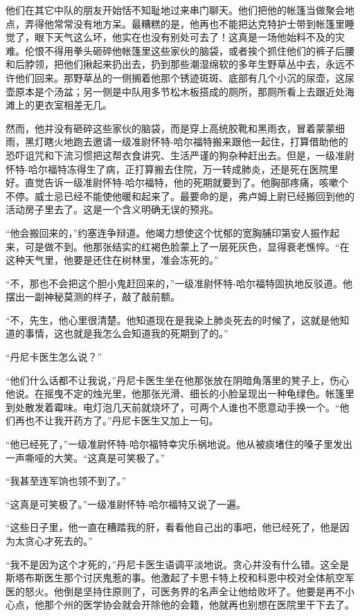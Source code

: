  


    他们在其它中队的朋友开始恬不知耻地过来串门聊天。他们把他的帐篷当做聚会地点，弄得他常常没有地方呆。最糟糕的是，他再也不能把达克特护士带到帐篷里睡觉了，眼下天气这么坏，他实在也没有别处可去了！这真是一场他始料不及的灾难。伦恨不得用拳头砸碎他帐篷里这些家伙的脑袋，或者挨个抓住他们的裤子后腰和后脖领，把他们揪起来扔出去，扔到那些潮湿绵软的多年生野草丛中去，永远不许他们回来。那野草丛的一侧搁着他那个锈迹斑斑、底部有几个小沉的尿壶，这尿壶原本是个汤盆；另一侧是中队用多节松木板搭成的厕所，那厕所看上去跟近处海滩上的更衣室相差无几。

    然而，他并没有砸碎这些家伙的脑袋，而是穿上高统胶靴和黑雨衣，冒着蒙蒙细雨，黑灯瞎火地跑去邀请一级准尉怀特-哈尔福特搬来跟他一起住，打算借助他的恐吓诅咒和下流习惯把这帮衣食讲究、生活严谨的狗杂种赶出去。但是，一级准尉怀特-哈尔福特冻得生了病，正打算搬去住院，万一转成肺炎，还是死在医院里好。直觉告诉一级准尉怀特-哈尔福特，他的死期就要到了。他胸部疼痛，咳嗽个不停。威士忌已经不能使他暖和起来了。最要命的是，弗卢姆上尉已经搬回到他的活动房子里去了。这是一个含义明确无误的预兆。

    “他会搬回来的，”约塞连争辩道。他竭力想使这个忧郁的宽胸脯印第安人振作起来，可是做不到。他那张结实的红褐色脸蒙上了一层死灰色，显得衰老憔悴。“在这种天气里，他要是还住在树林里，准会冻死的。”

    “不，那也不会把这个胆小鬼赶回来的，”一级准尉怀特-哈尔福特固执地反驳道。他摆出一副神秘莫测的样子，敲了敲前额。

 


    “不，先生，他心里很清楚。他知道现在是我染上肺炎死去的时候了，这就是他知道的事情，这也就是我怎么会知道我的死期到了的。”

    “丹尼卡医生怎么说？”

    “他们什么话都不让我说，”丹尼卡医生坐在他那张放在阴暗角落里的凳子上，伤心他说。在摇曳不定的烛光里，他那张光滑、细长的小脸呈现出一种龟绿色。帐篷里到处散发着霉味。电灯泡几天前就烧坏了，可两个人谁也不愿意动手换一个。“他们再也不让我开药方了。”丹尼卡医生又加上一句。

    “他已经死了，”一级准尉怀特-哈尔福特幸灾乐祸地说。他从被痰堵住的嗓子里发出一声嘶哑的大笑。“这真是可笑极了。”

    “我甚至连军饷也领不到了。”

    “这真是可笑极了。”一级准尉怀特-哈尔福特又说了一遍。

    “这些日子里，他一直在糟踏我的肝，看看他自己出的事吧，他已经死了，他是因为太贪心才死去的。”

    “我不是因为这个才死的，”丹尼卡医生语调平淡地说。贪心并没有什么错。这全是斯塔布斯医生那个讨厌鬼惹的事。他激起了卡思卡特上校和科恩中校对全体航空军医的怒火。他倒是坚持住原则了，可医务界的名声全让他给败坏了。他要是再不小心点，他那个州的医学协会就会开除他的会籍，他就再也别想在医院里干下去了。


